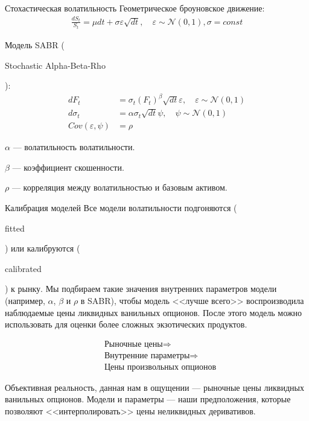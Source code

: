 \documentclass{beamer}
\newcommand{\en}[1]{\begin{otherlanguage}{english}#1\end{otherlanguage}}
\begin{document}
\begin{frame}{Стохастическая волатильность}
\justify
Геометрическое броуновское движение:
\begin{align*}
\frac{dS_t}{S_t} = \mu dt + \sigma\varepsilon\sqrt{dt}, \quad \varepsilon \sim \mathcal{N}(0, 1), \sigma = const
\end{align*}

\justify
Модель SABR (\en{Stochastic Alpha-Beta-Rho}):
\begin{align*}
dF_t &= \sigma_t(F_t)^\beta \sqrt{dt}\varepsilon, \quad \varepsilon \sim \mathcal{N}(0, 1) \\
d\sigma_t &= \alpha\sigma_t\sqrt{dt}\psi, \quad \psi \sim \mathcal{N}(0, 1) \\
Cov(\varepsilon, \psi) &= \rho
\end{align*}

\justify
$\alpha$ --- волатильность волатильности.

$\beta$ --- коэффициент скошенности.

$\rho$ --- корреляция между волатильностью и базовым активом.
\end{frame}



\begin{frame}{Калибрация моделей}
\justify
Все модели волатильности подгоняются (\en{fitted}) или калибруются (\en{calibrated}) к рынку. Мы подбираем такие значения внутренних параметров модели (например, $\alpha$, $\beta$ и $\rho$ в SABR), чтобы модель <<лучше всего>> воспроизводила наблюдаемые цены ликвидных ванильных опционов. После этого модель можно использовать для оценки более сложных экзотических продуктов.

\begin{align*}
&\text{Рыночные цены} \Rightarrow \\
&\text{Внутренние параметры} \Rightarrow \\
&\text{Цены произвольных опционов}
\end{align*}

\justify
Объективная реальность, данная нам в ощущении --- рыночные цены ликвидных ванильных опционов. Модели и параметры --- наши предположения, которые позволяют <<интерполировать>> цены неликвидных деривативов.
\end{frame}
\end{document}
